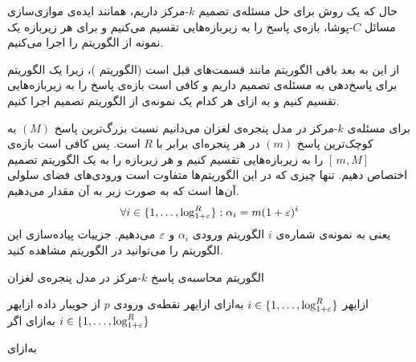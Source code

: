 حال که یک روش برای حل مسئله‌ی تصمیم $k$-مرکز داریم، همانند ایده‌ی موازی‌سازی مسائل $C$-پوشا، بازه‌ی پاسخ را به زیربازه‌هایی تقسیم می‌کنیم و برای هر زیربازه یک نمونه از الگوریتم  را اجرا می‌کنیم.

از این به بعد باقی الگوریتم مانند قسمت‌های قبل است (الگوریتم )، زیرا یک الگوریتم برای پاسخ‌دهی به مسئله‌ی تصمیم داریم و کافی است بازه‌ی پاسخ را به زیربازه‌هایی تقسیم کنیم و به ازای هر کدام یک نمونه‌ی از الگوریتم تصمیم اجرا کنیم.

برای مسئله‌ی $k$-مرکز در مدل پنجره‌ی لغزان می‌دانیم نسبت بزرگ‌ترین پاسخ $(M)$ به کوچک‌ترین پاسخ $(m)$ در هر پنجره‌ای برابر با $R$ است. پس کافی است بازه‌ی 
$ [\, m, M]\,$
را به زیربازه‌هایی تقسیم کنیم و هر زیربازه را به یک الگوریتم تصمیم اختصاص دهیم. تنها چیزی که در این الگوریتم‌ها متفاوت است ورودی‌های فضای سلولی آن‌ها است که به صورت زیر به آن مقدار می‌دهیم.
$$ \forall i \in  \{1, \ldots, \log_{1+\varepsilon}^{R} \}: \alpha_i = m  (1+\varepsilon)^i$$
یعنی به نمونه‌ی شماره‌ی $i$  الگوریتم  ورودی $\alpha_i$ و $\varepsilon$ می‌دهیم. جزییات پیاده‌سازی این الگوریتم را می‌توانید در الگوریتم  مشاهده کنید.

\caption
{الگوریتم محاسبه‌ی پاسخ $k$-مرکز در مدل پنجره‌ی لغزان}
‌ازای{هر $ i \in  \{1, \ldots, \log_{1+\varepsilon}^{R} \}$ }
‌به‌ازای{}
‌ازای{هر نقطه‌ی ورودی $p$ از جویبار داده}
‌ازای{هر$ i \in  \{1, \ldots, \log_{1+\varepsilon}^{R} \}$ }
‌به‌ازای{}
‌اگر{}

‌به‌ازای{}

